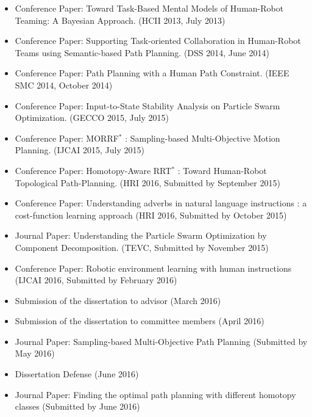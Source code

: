 \documentclass[phd]{byuprop}
\begin{document}
\begin{itemize}
\item Conference Paper: Toward Task-Based Mental Models of Human-Robot Teaming: A Bayesian Approach. (HCII 2013, July 2013)
\item Conference Paper: Supporting Task-oriented Collaboration in Human-Robot Teams using Semantic-based Path Planning. (DSS 2014, June 2014)
\item Conference Paper: Path Planning with a Human Path Constraint. (IEEE SMC 2014, October 2014)
\item Conference Paper: Input-to-State Stability Analysis on Particle Swarm Optimization. (GECCO 2015, July 2015)
\item Conference Paper: MORRF$^{*}$ : Sampling-based Multi-Objective Motion Planning. (IJCAI 2015, July 2015)
\item Conference Paper: Homotopy-Aware RRT$^{*}$ : Toward Human-Robot Topological Path-Planning. (HRI 2016, Submitted by September 2015)
\item Conference Paper: Understanding adverbs in natural language instructions : a
cost-function learning approach (HRI 2016, Submitted by October 2015)
\item Journal Paper: Understanding the Particle Swarm Optimization by Component Decomposition. (TEVC, Submitted by November 2015)
\item Conference Paper: Robotic environment learning with human instructions (IJCAI 2016, Submitted by February 2016)
\item Submission of the dissertation to advisor (March 2016)
\item Submission of the dissertation to committee members (April 2016)
\item Journal Paper: Sampling-based Multi-Objective Path Planning (Submitted by May 2016)
\item Dissertation Defense (June 2016)
\item Journal Paper: Finding the optimal path planning with different homotopy classes (Submitted by June 2016)
\end{itemize}
\end{document}
